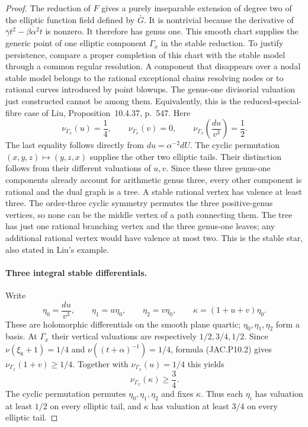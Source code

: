 \begin{proof}
The reduction of $F$ gives a purely inseparable extension of degree
two of the elliptic function field defined by $\bar G$. It is
nontrivial because the derivative of
$\bar\gamma t^2-\overline{\beta\alpha^2}t$ is nonzero.
It therefore has genus one. This smooth chart supplies the generic
point of one elliptic component $\Gamma_x$ in the stable reduction.
To justify persistence, compare a proper completion of this chart
with the stable model through a common regular resolution. A
component that disappears over a nodal stable model belongs to the
rational exceptional chains resolving nodes or to rational curves
introduced by point blowups. The genus-one divisorial valuation
just constructed cannot be among them. Equivalently, this is the
reduced-special-fibre case of Liu, Proposition~10.4.37, p.~547.
Here
\[
 \nu_{\Gamma_x}(u)=\frac14,\qquad
 \nu_{\Gamma_x}(v)=0,
 \qquad
 \nu_{\Gamma_x}\!\left(\frac{du}{v^3}\right)=\frac12.
                                                        \tag{JAC.P10.5}
\]
The last equality follows directly from $du=\alpha^{-2}dU$.
The cyclic permutation $(x,y,z)\mapsto(y,z,x)$ supplies the other
two elliptic tails. Their distinction follows from their different
valuations of $u,v$. Since these three genus-one components already
account for arithmetic genus three, every other component is
rational and the dual graph is a tree. A stable rational vertex has
valence at least three. The order-three cyclic symmetry permutes
the three positive-genus vertices, so none can be the middle vertex
of a path connecting them. The tree has just one rational branching
vertex and the three genus-one leaves; any additional rational
vertex would have valence at most two. This is the stable star,
also stated in Liu's example.

\paragraph{Three integral stable differentials.}
Write
\[
 \eta_0=\frac{du}{v^3},\qquad
 \eta_1=u\eta_0,\qquad \eta_2=v\eta_0,
 \qquad \kappa=(1+u+v)\eta_0.
                                                        \tag{JAC.P10.6}
\]
These are holomorphic differentials on the smooth plane quartic;
$\eta_0,\eta_1,\eta_2$ form a basis. At $\Gamma_x$ their vertical
valuations are respectively $1/2,3/4,1/2$.
Since $\nu(\xi_8+1)=1/4$ and $\nu((t+\alpha)^{-1})=1/4$,
formula (JAC.P10.2) gives $\nu_{\Gamma_x}(1+v)\ge1/4$.
Together with $\nu_{\Gamma_x}(u)=1/4$ this yields
\[
 \nu_{\Gamma_x}(\kappa)\ge\frac34.
\]
The cyclic permutation permutes $\eta_0,\eta_1,\eta_2$ and fixes
$\kappa$. Thus each $\eta_i$ has valuation at least $1/2$ on
every elliptic tail, and $\kappa$ has valuation at least $3/4$
on every elliptic tail.


\end{proof}
